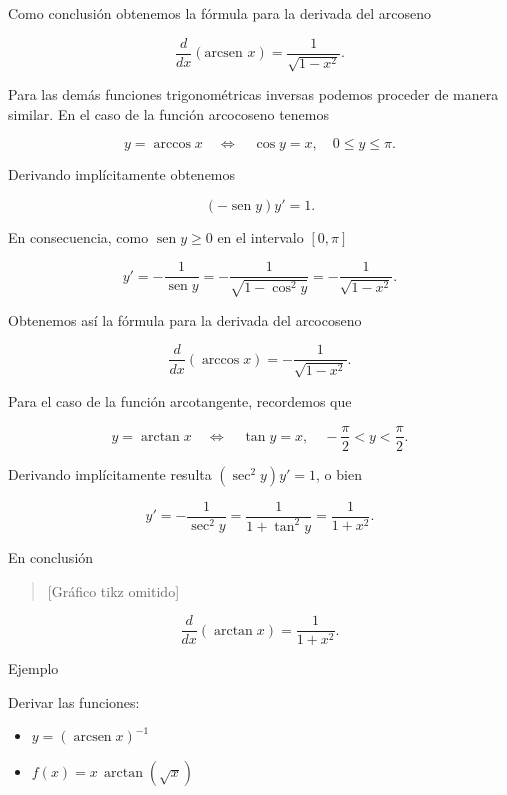 \documentclass[
  letterpaper,
]{book}
\providecommand{\tightlist}{%
  \setlength{\itemsep}{0pt}\setlength{\parskip}{0pt}}
\theoremstyle{plain}
\theoremstyle{remark}
\begin{document}
Como conclusión obtenemos la fórmula para la derivada del arcoseno

\label{form-derivada-arcoseno}
\[
\frac{d}{dx}(\text{arcsen }x)=\frac{1}{\sqrt{1-x^2}}.
\]

Para las demás funciones trigonométricas inversas podemos proceder de
manera similar. En el caso de la función arcocoseno tenemos

\[
y=\arccos x \quad\Longleftrightarrow\quad \cos y=x,\quad 0\leq y\leq \pi.
\]

Derivando implícitamente obtenemos

\[
(-\operatorname{sen} y)y'=1.
\]

En consecuencia, como \(\operatorname{sen} y\geq 0\) en el intervalo
\([0,\pi]\)

\[
y'=-\frac{1}{\operatorname{sen} y}=-\frac{1}{\sqrt{1-\cos^2 y}}=-\frac{1}{\sqrt{1-x^2}}.
\]

Obtenemos así la fórmula para la derivada del arcocoseno

\label{form-derivada-arcocoseno}
\[
\frac{d}{dx}(\arccos x)=-\frac{1}{\sqrt{1-x^2}}.
\]

Para el caso de la función arcotangente, recordemos que

\[
y=\arctan x \quad \Longleftrightarrow\quad \tan y=x,\quad -\frac{\pi}{2}<y<\frac{\pi}{2}.
\]

Derivando implícitamente resulta \((\sec^2 y)y'=1\), o bien

\[
y'=-\frac{1}{\sec^2 y}=\frac{1}{1+\tan^2y}=\frac{1}{1+x^2}.
\]

En conclusión

\begin{quote}
{[}Gráfico tikz omitido{]}
\end{quote}

\label{form-derivada-arcotangente}
\[
\frac{d}{dx}(\arctan x)=\frac{1}{1+x^2}.
\]

Ejemplo

Derivar las funciones:

\begin{itemize}
\tightlist
\item
  \(y=\displaystyle (\operatorname{arcsen} x)^{-1}\)
\item
  \(f(x)=x\,\arctan(\sqrt{x})\)
\end{itemize}
\end{document}
